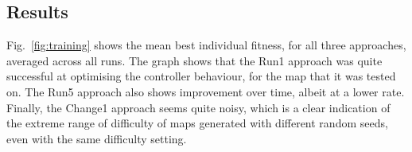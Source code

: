 \documentclass[conference]{IEEEtran}
\begin{document}
%

%
\subsection{Results}

Fig.~\ref{fig:training} shows the mean best individual fitness, for all three
approaches, averaged across all runs. The graph shows that the Run1
approach was quite successful at optimising the controller behaviour, for the
map that it was tested on. The Run5 approach also shows improvement over time,
albeit at a lower rate. Finally, the Change1 approach seems quite noisy, which
is a clear indication of the extreme range of difficulty of maps generated with
different random seeds, even with the same difficulty setting.
\end{document}
